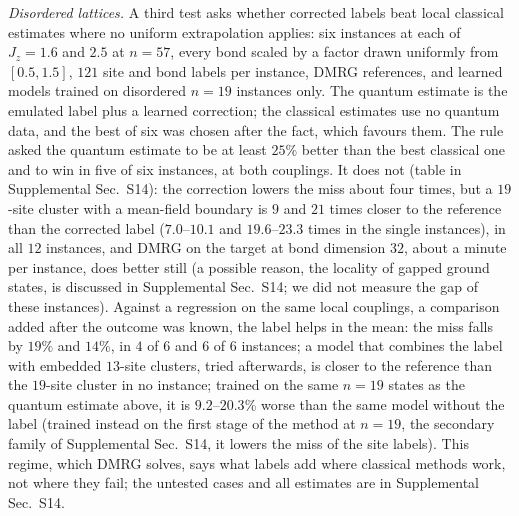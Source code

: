 \documentclass[aps,prx,twocolumn,10pt,superscriptaddress,nofootinbib,longbibliography,floatfix]{revtex4-2}
\theoremstyle{remark}
\newcommand{\Jz}{J_z}
\begin{document}
\emph{Disordered lattices.} A third test asks whether corrected labels beat local classical estimates where no
uniform extrapolation applies: six instances at each of $\Jz=1.6$ and $2.5$ at $n=57$, every bond scaled by a factor %
drawn uniformly from $[0.5,1.5]$, $121$ site and bond labels per instance, DMRG references, and learned models %
trained on disordered $n=19$ instances only. The
quantum estimate is the emulated label plus a learned correction; the classical estimates use no quantum data, and the
best of six was chosen after the fact, which favours them. The rule asked the quantum estimate to be at least $25\%$ %
better than the best classical one and to win in five of six instances, at both couplings. It does not
(table in Supplemental Sec.~S14): the correction lowers the miss about four times, but a $19$-site cluster with a mean-field
boundary is $9$ and $21$ times closer to the reference than the corrected label ($7.0$--$10.1$ and $19.6$--$23.3$ times in the single %
instances), in all $12$ instances, and DMRG on the target at bond dimension $32$, about a minute per instance, does %
better still (a possible reason, the locality of gapped ground states, is discussed in Supplemental Sec.~S14; we
did not measure the gap of these instances). Against a regression on the same local
couplings, a comparison added after the outcome was known, the label helps in the mean: the miss falls by $19\%$ and %
$14\%$, in $4$ of $6$ and $6$ of $6$ instances; a model that combines the label with embedded $13$-site clusters, tried afterwards, %
is closer to the reference than the $19$-site cluster in no instance; trained on the same $n=19$ states as the %
quantum estimate above, it is $9.2$--$20.3\%$ worse than the same model without the label (trained instead on the %
first stage of the method at $n=19$, the secondary family of Supplemental Sec.~S14, it lowers the miss of the site %
labels). This regime, which DMRG solves, says what labels add where classical
methods work, not where they fail; the untested cases and all estimates are in Supplemental Sec.~S14.
\end{document}
